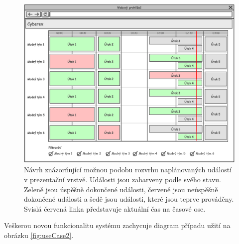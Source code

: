 \documentclass[
  digital,
  twoside,
  table, 
  nolof, 
  nolot
]{fithesis3}
\begin{document}
\begin{figure}
    \centering
    \includegraphics[width=13cm]{images/Web-Wireframe1.eps}
    \caption{Návrh znázorňující možnou podobu rozvrhu naplánovaných událostí v prezentační vrstvě. Události jsou zabarveny podle svého stavu. Zeleně jsou úspěšně dokončené události, červeně jsou neúspěšně dokončené události a šedě jsou události, které jsou teprve prováděny. Svislá červená linka představuje aktuální čas na časové ose.}
    \label{fig:wireframeTimetable}
\end{figure}

Veškerou novou funkcionalitu systému zachycuje diagram případu užití na obrázku \ref{fig:useCase2}.
\end{document}
